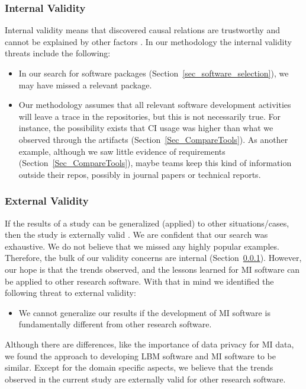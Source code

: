 \documentclass[11pt]{article}
\begin{document}
\subsubsection{Internal Validity} \label{Sec_InternalValidity}

Internal validity means that discovered causal relations are trustworthy and
cannot be explained by other factors \citep{RunesonAndHost2009}. In our
methodology the internal validity threats include the following:

\begin{itemize}
\item In our search for software packages
(Section~\ref{sec_software_selection}), we may have missed a relevant package.
\item Our methodology assumes that all relevant software development activities
will leave a trace in the repositories, but this is not necessarily true. For
instance, the possibility exists that CI usage was higher than what we observed
through the artifacts (Section~\ref{Sec_CompareTools}). As another example,
although we saw little evidence of requirements
(Section~\ref{Sec_CompareTools}), maybe teams keep this kind of information
outside their repos, possibly in journal papers or technical reports.
\end{itemize}

\subsubsection{External Validity}

If the results of a study can be generalized (applied) to other
situations/cases, then the study is externally valid \citep{RunesonAndHost2009}.
We are confident that our search was exhaustive.  We do not believe that we
missed any highly popular examples.  Therefore, the bulk of our validity
concerns are internal (Section~\ref{Sec_InternalValidity}).
However, our hope is that the trends observed, and the lessons learned for MI
software can be applied to other research software.  With that in mind we
identified the following threat to external validity:

\begin{itemize}
\item We cannot generalize our results if the development of MI software is
fundamentally different from other research software.
\end{itemize}

Although there are differences, like the importance of data privacy for MI data,
we found the approach to developing LBM software \citep{SmithEtAl2024} and MI
software to be similar.  Except for the domain specific aspects, we believe that
the trends observed in the current study are externally valid for other research
software.
\end{document}

